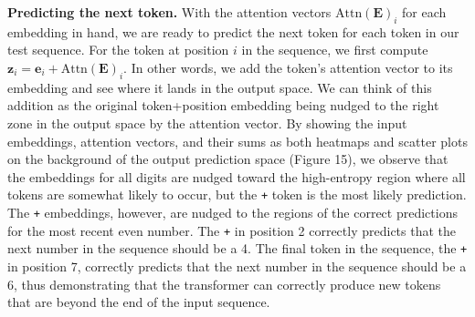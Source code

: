 \documentclass[
  11pt,
  a4paper,
]{article}
\begin{document}
\textbf{Predicting the next token.} With the attention vectors
\(\mathrm{Attn}(\mathbf{E})_i\) for each embedding in hand, we are ready
to predict the next token for each token in our test sequence. For the
token at position \(i\) in the sequence, we first compute
\(\mathbf{z}_i = \mathbf{e}_i + \mathrm{Attn}(\mathbf{E})_i\). In other
words, we add the token's attention vector to its embedding and see
where it lands in the output space. We can think of this addition as the
original token+position embedding being nudged to the right zone in the
output space by the attention vector. By showing the input embeddings,
attention vectors, and their sums as both heatmaps and scatter plots on
the background of the output prediction space (Figure 15), we observe
that the embeddings for all digits are nudged toward the high-entropy
region where all tokens are somewhat likely to occur, but the \texttt{+}
token is the most likely prediction. The \texttt{+} embeddings, however,
are nudged to the regions of the correct predictions for the most recent
even number. The \texttt{+} in position 2 correctly predicts that the
next number in the sequence should be a 4. The final token in the
sequence, the \texttt{+} in position 7, correctly predicts that the next
number in the sequence should be a 6, thus demonstrating that the
transformer can correctly produce new tokens that are beyond the end of
the input sequence.
\end{document}
